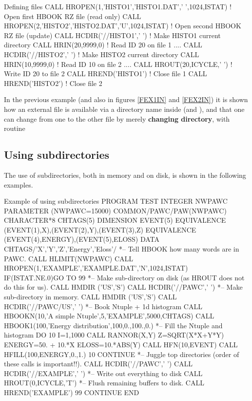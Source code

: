 \begin{XMPt}{Defining \HBOOK{} files}
 CALL HROPEN(1,'HISTO1','HISTO1.DAT',' ',1024,ISTAT)    ! Open first  HBOOK RZ file (read only)
 CALL HROPEN(2,'HISTO2','HISTO2.DAT','U',1024,ISTAT)    ! Open second HBOOK RZ file (update)
 CALL HCDIR('//HISTO1',' ')                             ! Make HISTO1 current directory
 CALL HRIN(20,9999,0)                                   ! Read ID 20 on file 1
   ....
 CALL HCDIR('//HISTO2',' ')                             ! Make HISTO2 current directory
 CALL HRIN(10,9999,0)                                   ! Read ID 10 on file 2
   ....
 CALL HROUT(20,ICYCLE,' ')                              ! Write ID 20 to file 2
 CALL HREND('HISTO1')                                   ! Close file 1
 CALL HREND('HISTO2')                                   ! Close file 2
\end{XMPt}
      
In the previous example (and also in figures \ref{FEX1IN}
and \ref{FEX2IN}) it is shown how an external file
is available via a directory name inside \HBOOK{} (and \PAW{}), and that one
can change from one to the other file by merely
{\bf changing directory}, with \HBOOK{} routine 

\newpage
\subsection*{Using subdirectories}

The use of subdirectories, both in memory and on disk, is
shown in the following examples.

\begin{XMPt}{Example of using subdirectories}
      PROGRAM TEST
      INTEGER    NWPAWC
      PARAMETER (NWPAWC=15000)
      COMMON/PAWC/PAW(NWPAWC)
      CHARACTER*8 CHTAGS(5)
      DIMENSION EVENT(5)
      EQUIVALENCE (EVENT(1),X),(EVENT(2),Y),(EVENT(3),Z)
      EQUIVALENCE (EVENT(4),ENERGY),(EVENT(5),ELOSS)
      DATA CHTAGS/'X','Y','Z','Energy','Eloss'/
*-- Tell HBOOK how many words are in PAWC.
      CALL HLIMIT(NWPAWC)
      CALL HROPEN(1,'EXAMPLE','EXAMPLE.DAT','N',1024,ISTAT)
      IF(ISTAT.NE.0)GO TO 99
*-- Make sub-directory on disk (as HROUT does not do this for us).
      CALL HMDIR ('US','S')
      CALL HCDIR('//PAWC',' ')
*-- Make sub-directory in memory.
      CALL HMDIR ('US','S')
      CALL HCDIR('//PAWC/US',' ')
*-- Book Ntuple + 1d histogram
      CALL HBOOKN(10,'A simple Ntuple',5,'EXAMPLE',5000,CHTAGS)
      CALL HBOOK1(100,'Energy distribution',100,0.,100.,0.)
*-- Fill the Ntuple and histogram
      DO 10 I=1,1000
         CALL RANNOR(X,Y)
         Z=SQRT(X*X+Y*Y)
         ENERGY=50. + 10.*X
         ELOSS=10.*ABS(Y)
         CALL HFN(10,EVENT)
         CALL HFILL(100,ENERGY,0.,1.)
 10   CONTINUE
*-- Juggle top directories (order of these calls is important!!).
      CALL HCDIR('//PAWC',' ')
      CALL HCDIR('//EXAMPLE',' ')
*-- Write out everything to disk
      CALL HROUT(0,ICYCLE,'T')
*-- Flush remaining buffers to disk.
      CALL HREND('EXAMPLE')
 99   CONTINUE
      END
\end{XMPt}

\endinput


